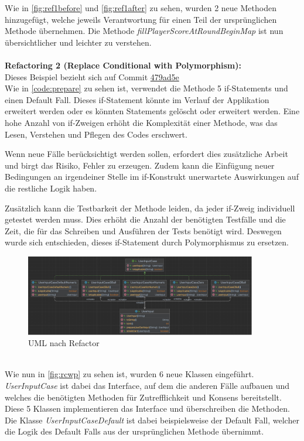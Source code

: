 Wie in \autoref{fig:ref1before} und \autoref{fig:ref1after} zu sehen, wurden 2 neue Methoden hinzugefügt, welche jeweils Verantwortung für einen Teil der ursprünglichen Methode übernehmen. Die Methode \textit{fillPlayerScoreAtRoundBeginMap} ist nun übersichtlicher und leichter zu verstehen.\\\\
\textbf{Refactoring 2 (Replace Conditional with Polymorphism):}\\
Dieses Beispiel bezieht sich auf Commit \href{https://github.com/P3lina/ASE-Project/commit/479ad5e6fddd23eb7df3697e75d55b52b255b301}{479ad5e}\\

Wie in \autoref{code:prepare} zu sehen ist, verwendet die Methode 5 if-Statements und einen Default Fall. Dieses if-Statement könnte im Verlauf der Applikation erweitert werden oder es könnten Statements gelöscht oder erweitert werden. Eine hohe Anzahl von if-Zweigen erhöht die Komplexität einer Methode, was das Lesen, Verstehen und Pflegen des Codes erschwert.

Wenn neue Fälle berücksichtigt werden sollen, erfordert dies zusätzliche Arbeit und birgt das Risiko, Fehler zu erzeugen. Zudem kann die Einfügung neuer Bedingungen an irgendeiner Stelle im if-Konstrukt unerwartete Auswirkungen auf die restliche Logik haben.

Zusätzlich kann die Testbarkeit der Methode leiden, da jeder if-Zweig individuell getestet werden muss. Dies erhöht die Anzahl der benötigten Testfälle und die Zeit, die für das Schreiben und Ausführen der Tests benötigt wird.
Deswegen wurde sich entschieden, dieses if-Statement durch Polymorphismus zu ersetzen.\\
\begin{figure}[ht]
    \centering
    \includegraphics[width=0.9\textwidth]{Bilder/rcwp.png}
    \caption{UML nach Refactor}
    \label{fig:rcwp}
\end{figure}\\
Wie nun in \autoref{fig:rcwp} zu sehen ist, wurden 6 neue Klassen eingeführt. \textit{UserInputCase} ist dabei das Interface, auf dem die anderen Fälle aufbauen und welches die benötigten Methoden für Zutrefflichkeit und Konsens bereitstellt. Diese 5 Klassen implementieren das Interface und überschreiben die Methoden. Die Klasse \textit{UserInputCaseDefault} ist dabei beispielsweise der Default Fall, welcher die Logik des Default Falls aus der ursprünglichen Methode übernimmt.